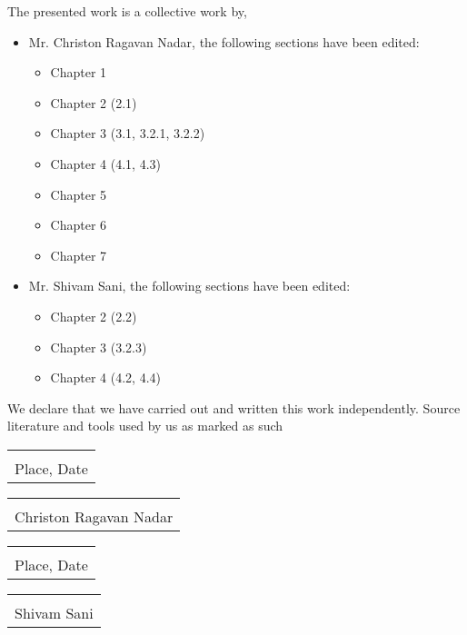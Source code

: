 \documentclass[
11pt, %
english, %
singlespacing, %
headsepline, %
]{mediaproject} %
\begin{document}
\begin{DeclarationOFIndependence}
\addchaptertocentry{\DeclarationOIname} 
The presented work is a collective work by,

\begin{itemize} 
    \item Mr. Christon Ragavan Nadar, the following sections have been edited:
    \begin{itemize} 
    \item Chapter 1 
    \item Chapter 2 (2.1) 
    \item Chapter 3 (3.1, 3.2.1, 3.2.2)
    \item Chapter 4 (4.1, 4.3)
    \item Chapter 5
    \item Chapter 6
    \item Chapter 7
    \end{itemize}
\end{itemize}



\begin{itemize}
\item Mr. Shivam Sani, the following sections have been edited:
\begin{itemize}
    \item Chapter 2 (2.2) 
    \item Chapter 3 (3.2.3)
    \item Chapter 4 (4.2, 4.4)
\end{itemize}
\end{itemize}


We declare that we have carried out and written this work independently. Source literature and tools used by us as marked as such




\vspace{2cm}
\begin{tabular}{p{5cm}}
	\dotfill \\
	Place, Date
\end{tabular}
\hfill
\begin{tabular}{p{5cm}}
	\dotfill \\
	Christon Ragavan Nadar
\end{tabular}

\vspace{2cm}
\begin{tabular}{p{5cm}}
	\dotfill \\
	Place, Date
\end{tabular}
\hfill
\begin{tabular}{p{5cm}}
	\dotfill \\
	Shivam Sani
\end{tabular}



\end{DeclarationOFIndependence}
\end{document}

